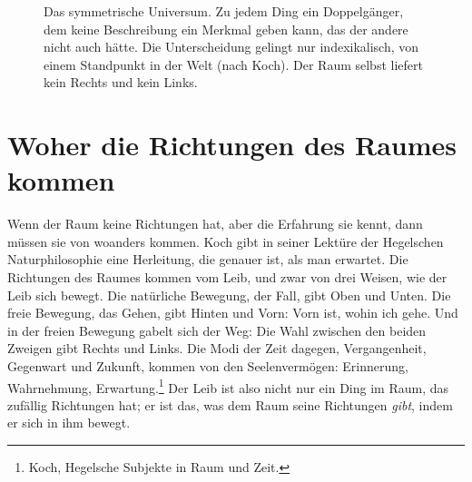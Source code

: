 \begin{figure}[htbp]
\centering
{}
\caption{Das symmetrische Universum. Zu jedem Ding ein Doppelgänger, dem keine Beschreibung ein Merkmal geben kann, das der andere nicht auch hätte. Die Unterscheidung gelingt nur indexikalisch, von einem Standpunkt in der Welt (nach Koch). Der Raum selbst liefert kein Rechts und kein Links.}
\label{abb:doppelgaenger}
\end{figure}

\section{Woher die Richtungen des Raumes kommen}

Wenn der Raum keine Richtungen hat, aber die Erfahrung sie kennt, dann müssen sie von woanders kommen. Koch gibt in seiner Lektüre der Hegelschen Naturphilosophie eine Herleitung, die genauer ist, als man erwartet. Die Richtungen des Raumes kommen vom Leib, und zwar von drei Weisen, wie der Leib sich bewegt. Die natürliche Bewegung, der Fall, gibt Oben und Unten. Die freie Bewegung, das Gehen, gibt Hinten und Vorn: Vorn ist, wohin ich gehe. Und in der freien Bewegung gabelt sich der Weg: Die Wahl zwischen den beiden Zweigen gibt Rechts und Links. Die Modi der Zeit dagegen, Vergangenheit, Gegenwart und Zukunft, kommen von den Seelenvermögen: Erinnerung, Wahrnehmung, Erwartung.\footnote{Koch, Hegelsche Subjekte in Raum und Zeit.} Der Leib ist also nicht nur ein Ding im Raum, das zufällig Richtungen hat; er ist das, was dem Raum seine Richtungen \emph{gibt}, indem er sich in ihm bewegt.

